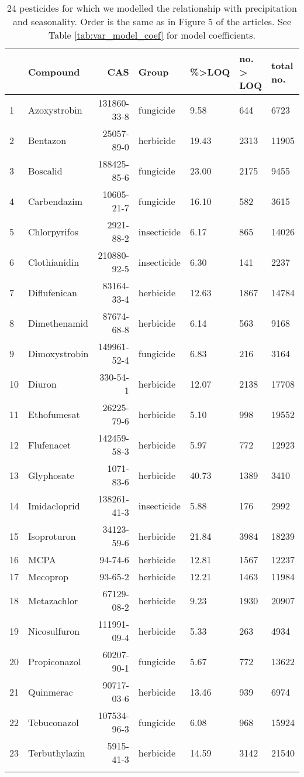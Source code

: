 \begingroup\fontsize{8pt}{10pt}\selectfont
\begin{longtable}{lp{2.5cm}rlp{1.5cm}p{2cm}p{2cm}}
\caption{24 pesticides for which we modelled the relationship with precipitation and seasonality.
                    Order is the same as in Figure 5 of the articles. See Table \ref{tab:var_model_coef} for model coefficients.} \\ 
  \toprule
 & Compound & CAS & Group & \%>LOQ & no. > LOQ & total no. \\ 
  \midrule
1 & Azoxystrobin & 131860-33-8 & fungicide & 9.58 & 644 & 6723 \\ 
  2 & Bentazon & 25057-89-0 & herbicide & 19.43 & 2313 & 11905 \\ 
  3 & Boscalid & 188425-85-6 & fungicide & 23.00 & 2175 & 9455 \\ 
  4 & Carbendazim & 10605-21-7 & fungicide & 16.10 & 582 & 3615 \\ 
  5 & Chlorpyrifos & 2921-88-2 & insecticide & 6.17 & 865 & 14026 \\ 
  6 & Clothianidin & 210880-92-5 & insecticide & 6.30 & 141 & 2237 \\ 
  7 & Diflufenican & 83164-33-4 & herbicide & 12.63 & 1867 & 14784 \\ 
  8 & Dimethenamid & 87674-68-8 & herbicide & 6.14 & 563 & 9168 \\ 
  9 & Dimoxystrobin & 149961-52-4 & fungicide & 6.83 & 216 & 3164 \\ 
  10 & Diuron & 330-54-1 & herbicide & 12.07 & 2138 & 17708 \\ 
  11 & Ethofumesat & 26225-79-6 & herbicide & 5.10 & 998 & 19552 \\ 
  12 & Flufenacet & 142459-58-3 & herbicide & 5.97 & 772 & 12923 \\ 
  13 & Glyphosate & 1071-83-6 & herbicide & 40.73 & 1389 & 3410 \\ 
  14 & Imidacloprid & 138261-41-3 & insecticide & 5.88 & 176 & 2992 \\ 
  15 & Isoproturon & 34123-59-6 & herbicide & 21.84 & 3984 & 18239 \\ 
  16 & MCPA & 94-74-6 & herbicide & 12.81 & 1567 & 12237 \\ 
  17 & Mecoprop & 93-65-2 & herbicide & 12.21 & 1463 & 11984 \\ 
  18 & Metazachlor & 67129-08-2 & herbicide & 9.23 & 1930 & 20907 \\ 
  19 & Nicosulfuron & 111991-09-4 & herbicide & 5.33 & 263 & 4934 \\ 
  20 & Propiconazol & 60207-90-1 & fungicide & 5.67 & 772 & 13622 \\ 
  21 & Quinmerac & 90717-03-6 & herbicide & 13.46 & 939 & 6974 \\ 
  22 & Tebuconazol & 107534-96-3 & fungicide & 6.08 & 968 & 15924 \\ 
  23 & Terbuthylazin & 5915-41-3 & herbicide & 14.59 & 3142 & 21540 \\ 
   \bottomrule
\label{tab:var_model}
\end{longtable}
\endgroup
